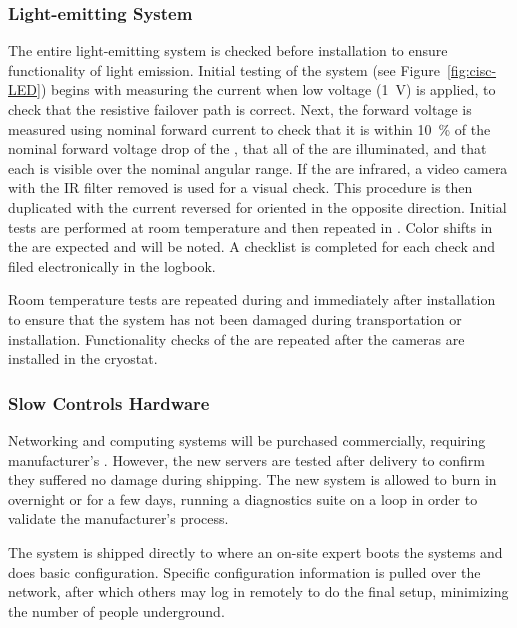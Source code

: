 \subsubsection{Light-emitting System}
\label{sec:fdgen-slow-cryo-qc-les}

The entire light-emitting system is checked before installation to ensure functionality of light emission. 
Initial testing of the system (see Figure~\ref{fig:cisc-LED}) begins with
measuring the current when low voltage (\SI{1}{V}) is applied, to check
that the resistive  failover path is correct. Next, the forward voltage is measured using nominal forward current to
check that it is within \SI{10}{\%} of the nominal forward voltage drop of
the , that all of the  are illuminated, and that each  is visible over the nominal angular range. If the  are
infrared, a video camera with the IR filter removed is used for a
visual check. This procedure is then duplicated with the current
reversed for  oriented in the opposite direction. Initial tests are performed at room temperature and then repeated in . Color shifts in the  are expected and will be noted. A checklist is completed for each  check and filed electronically in the  logbook.

Room temperature tests are repeated during and immediately after installation to ensure that the system has not been damaged during transportation or installation. Functionality checks of the  are repeated after the cameras are installed in the cryostat.

\subsubsection{Slow Controls Hardware}
\label{sec:fdsp-slow-cryo-qc-sc-hard}

Networking and computing systems will be purchased commercially, requiring manufacturer's . However, the new servers %
are tested after delivery to confirm they suffered no damage during shipping. The new system is allowed to burn in overnight or for a few days, 
running a diagnostics suite on a loop in order to validate %
the manufacturer's  process.

The system %
is shipped directly to \surf
where an on-site
expert %
boots the systems and does basic
configuration. %
Specific configuration information %
is pulled over
the network, after which others may log in remotely to do the final
setup, minimizing the number of people underground.


